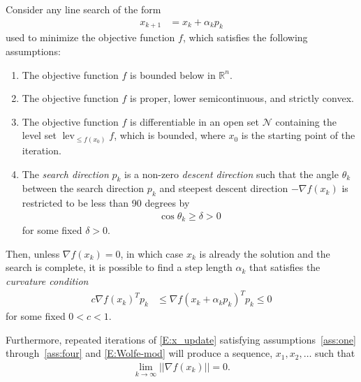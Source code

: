 \documentclass[oneside]{myumnStatThesis}
\DeclareMathOperator{\lev}{lev}
\def\RR{{\mathbb R}}
\def\NN{{\mathcal N}}
\begin{document}
\begin{theorem} \label{Thm:Line Search}
Consider any line search of the form 
\begin{align}
	x_{k+1} &= x_k + \alpha_k p_k \label{E:x_update}
\end{align}
used to minimize the objective function $f$, which satisfies the following assumptions:
\begin{enumerate}
	\item The objective function $f$ is bounded below in $\RR^n$. \label{ass:one}
	\item The objective function $f$ is proper, lower semicontinuous, and strictly convex.
	\item The objective function $f$ is differentiable in an open set $\NN$ containing the level set $\lev_{\leq f
(x_0)} f$, which is bounded, where $x_0$ is the starting point of the iteration.
\item The \emph{search direction} $p_k$ is a non-zero \emph{descent direction} \label{ass:four}
such that the angle $\theta_k$ between the search direction $p_k$ and steepest descent direction $-\nabla f(x_k)$ is 
restricted to be less than 90 degrees by
\begin{align*}
\cos \theta_k \geq \delta > 0
\end{align*}
 for some fixed $\delta > 0$.  
\end{enumerate}

Then, unless $\nabla f(x_k) = 0$, in which case $x_k$ is already the solution and the search is complete, it is 
possible to find a step length $\alpha_k$ that satisfies the \emph{curvature condition}
\begin{align}
	c \nabla f(x_k)^T p_k &\leq \nabla f( x_k + \alpha_k p_k)^T p_k \leq 0 \label{E:Wolfe-mod}
\end{align}
for some fixed $0 < c < 1$.

Furthermore, repeated iterations of \eqref{E:x_update} satisfying assumptions~\ref{ass:one} through~\ref{ass:four} and \eqref{E:Wolfe-mod} will produce 
a sequence, $x_1, x_2, \ldots$ such that
\begin{align*}
	\lim_{k \to \infty} || \nabla f(x_k) || = 0.
\end{align*}
\end{theorem}
\end{document}
